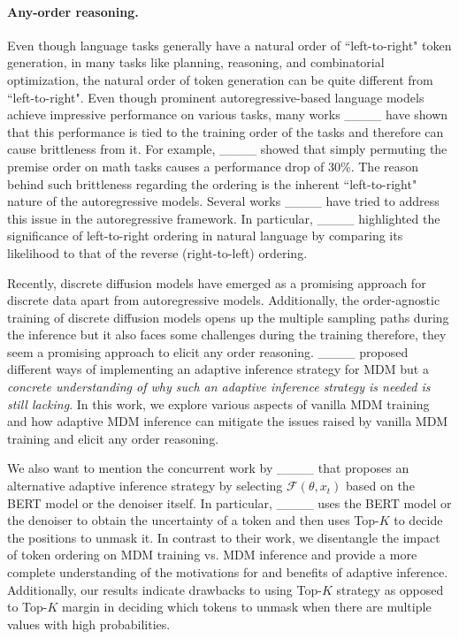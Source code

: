 \paragraph{Any-order reasoning.} Even though language tasks generally have a natural order of ``left-to-right" token generation, in many tasks like planning, reasoning, and combinatorial optimization, the natural order of token generation can be quite different from ``left-to-right". Even though prominent autoregressive-based language models achieve impressive performance on various tasks, many works ____ have shown that this performance is tied to the training order of the tasks and therefore can cause brittleness from it. For example, ____ showed that simply permuting the premise order on math tasks causes a performance drop of 30\%. The reason behind such brittleness regarding the ordering is the inherent ``left-to-right" nature of the autoregressive models. Several works ____ have tried to address this issue in the autoregressive framework. In particular, ____ highlighted the significance of left-to-right ordering in natural language by comparing its likelihood to that of the reverse (right-to-left) ordering.

Recently, discrete diffusion models have emerged as a promising approach for discrete data apart from autoregressive models. Additionally, the order-agnostic training of discrete diffusion models opens up the multiple sampling paths during the inference but it also faces some challenges during the training therefore, they seem a promising approach to elicit any order reasoning. ____ proposed different ways of implementing an adaptive inference strategy for MDM but a \emph{concrete understanding of why such an adaptive inference strategy is needed is still lacking}. In this work, we explore various aspects of vanilla MDM training and how adaptive MDM inference can mitigate the issues raised by vanilla MDM training and elicit any order reasoning. 

We also want to mention the concurrent work by ____ that proposes an alternative adaptive inference strategy by selecting $\mathcal F(\theta, x_t)$ based on the BERT model or the denoiser itself. In particular, ____ uses the BERT model or the denoiser to obtain the uncertainty of a token and then uses Top-$K$ to decide the positions to unmask it. In contrast to their work, we disentangle the impact of token ordering on MDM training vs. MDM inference and provide a more complete understanding of the motivations for and benefits of adaptive inference. Additionally, our results indicate drawbacks to using Top-$K$ strategy as opposed to Top-$K$ margin in deciding which tokens to unmask when there are multiple values with high probabilities.

